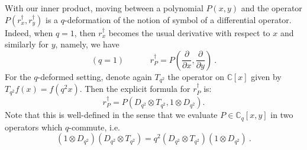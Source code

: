 \documentclass[a4paper,12pt]{article}
\numberwithin{equation}{section}
\newcommand{\C}{\mathbb{C}}
\theoremstyle{rem}
\theoremstyle{definition}
\begin{document}
With our inner product, moving between a polynomial $P(x,y)$ and the operator $P(r_x^\dagger,r_y^{\dagger})$ is a $q$-deformation of the notion of symbol of a differential operator. Indeed, when $q=1$, then $r_x^\dagger$ becomes the usual derivative with respect to $x$ and similarly for $y$, namely, we have
\[(q=1)\qquad\ \ \ \ \ r^{\dagger}_P=P\left(\frac{\partial}{\partial x},\frac{\partial}{\partial y}\right)\ .\]
For the $q$-deformed setting, denote again $T_{q^2}$ the operator on $\C[x]$ given by $T_{q^2}f(x)=f(q^2x)$. Then the explicit formula for $r_P^{\dagger}$ is:
\begin{equation}\label{qsymbol1}
r_P^{\dagger}=P(D_{q^2}\otimes T_{q^2},1\otimes D_{q^2}).\end{equation}
Note that this is well-defined in the sense that we evaluate $P\in \C_q[x,y]$ in two operators which $q$-commute, i.e.
\[(1\otimes D_{q^2})(D_{q^2}\otimes T_{q^2})=q^2(D_{q^2}\otimes T_{q^2})(1\otimes D_{q^2})\ .\]
\end{document}

